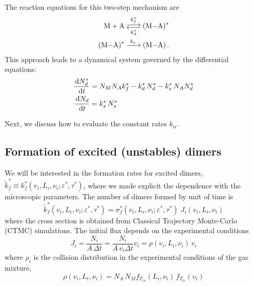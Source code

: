 The reaction equations for this two-step mechanism are
\begin{subequations}
\begin{align}
  \label{Q:rates-master-equation-a}
  \ce{M + A <-->[{k_{f}^{*}}][{k_{d}^{*}}] (M-A)^{*}} \\
  \label{Q:rates-master-equation-b}
  \ce{ (M-A)^{*} ->[{k_{s}}] (M-A)} \,.
\end{align}
\end{subequations}
%
This approach leads to a dynamical system governed by the differential equations:
\begin{subequations}
\begin{align}
  \label{Q:rates-diff-equation-a}
  \frac{\,\mathrm{d} N^{*}_{d}}{\,\mathrm{d} t} &= N_{M} N_{A} k_{f}^{*} - k_{d}^{*}\, N^{*}_{d} - k_{s}^{*}\, N_{A} N^{*}_{d} \\
  \label{Q:rates-diff-equation-b}
  \frac{\,\mathrm{d} N_{d}}{\,\mathrm{d} t} &=  k_{s}^{*}\, N^{*}_{s} 
\end{align}
\end{subequations}

Next, we discuss how to evaluate the constant rates $k_{\alpha}$.

\subsection{Formation of excited (unstables) dimers}
\label{S:excit-unst-dimers}

We will be interested in the formation rates for excited dimers, $\tilde{k}_{f}^{*} \equiv k_{f}^{*}(v_{i}, L_{i}, \nu_{i} ; \varepsilon^{*}, \tau^{*})$, where we made explicit the dependence with the microscopic parameters. The number of dimers formed by unit of time is
\begin{equation}
  \label{Q:def-dimer-rate}
  \tilde{k}_{f}^{*}(v_{i}, L_{i}, \nu_{i} ; \varepsilon^{*}, \tau^{*}) = \sigma_{f}^{*}(v_{i}, L_{i}, \nu_{i} ; \varepsilon^{*}, \tau^{*}) \; J_{i}(v_{i}, L_{i}, \nu_{i} )
\end{equation}
where the cross section is obtained from Classical Trajectory Monte-Carlo (CTMC) simulations. The initial flux depends on the experimental conditions
\begin{equation}
  \label{Q:rates-flux}
  J_{i} =\frac{N_{i}}{A \,\Delta t} = \frac{N_{i}}{A \, v_{i} \Delta t} v_{i} = \rho(v_{i}, L_{i}, \nu_{i})\, v_{i}
\end{equation}
%
where $\rho_{i}$ is the collision distribution in the experimental conditions of the gas mixture,
\begin{equation}
  \label{Q:rates-def-collis-distrib}
  \rho(v_{i}, L_{i}, \nu_{i}) = N_{A} \, N_{M} f_{T_{rv}}(L_{i},\nu_{i}) \, f_{T_{tr}}(v_{i})
\end{equation}

